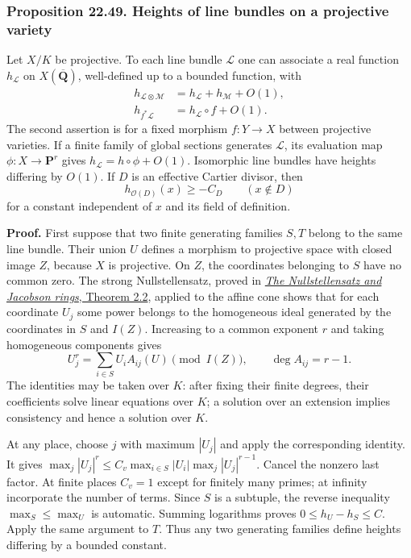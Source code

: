 \documentclass[
  11pt,
  a4paper,
]{article}
\begin{document}
\subsubsection{Proposition 22.49. Heights of line bundles on a
projective
variety}\label{proposition-22.49.-heights-of-line-bundles-on-a-projective-variety}

Let \(X/K\) be projective. To each line bundle \(\mathcal L\) one can
associate a real function \(h_{\mathcal L}\) on
\(X(\overline{\mathbf Q})\), well-defined up to a bounded function, with
\[
\begin{split}
 h_{\mathcal L\otimes\mathcal M}&=h_{\mathcal L}+h_{\mathcal M}+O(1),\\
 h_{f^*\mathcal L}&=h_{\mathcal L}\circ f+O(1).
\end{split}
\tag{22.115}
\] The second assertion is for a fixed morphism \(f:Y\to X\) between
projective varieties. If a finite family of global sections generates
\(\mathcal L\), its evaluation map \(\phi:X\to\mathbf P^r\) gives
\(h_{\mathcal L}=h\circ\phi+O(1)\). Isomorphic line bundles have heights
differing by \(O(1)\). If \(D\) is an effective Cartier divisor, then \[
 h_{\mathcal O(D)}(x)\ge-C_D\qquad(x\notin D)
 \tag{22.116}
\] for a constant independent of \(x\) and its field of definition.

\textbf{Proof.} First suppose that two finite generating families
\(S,T\) belong to the same line bundle. Their union \(U\) defines a
morphism to projective space with closed image \(Z\), because \(X\) is
projective. On \(Z\), the coordinates belonging to \(S\) have no common
zero. The strong Nullstellensatz, proved in
\href{https://kokunoyumeto.github.io/open-math-courses-public/courses/AG-CA/the-nullstellensatz-and-jacobson-rings.html\#2-closed-points-detect-radical-equations}{\emph{The
Nullstellensatz and Jacobson rings}, Theorem 2.2}, applied to the affine
cone shows that for each coordinate \(U_j\) some power belongs to the
homogeneous ideal generated by the coordinates in \(S\) and \(I(Z)\).
Increasing to a common exponent \(r\) and taking homogeneous components
gives \[
 U_j^r=\sum_{i\in S}U_i A_{ij}(U)\pmod{I(Z)},
 \qquad \deg A_{ij}=r-1.
 \tag{22.117}
\] The identities may be taken over \(K\): after fixing their finite
degrees, their coefficients solve linear equations over \(K\); a
solution over an extension implies consistency and hence a solution over
\(K\).

At any place, choose \(j\) with maximum \(|U_j|\) and apply the
corresponding identity. It gives
\(\max_j|U_j|^r\le C_v\max_{i\in S}|U_i|\max_j|U_j|^{r-1}\). Cancel the
nonzero last factor. At finite places \(C_v=1\) except for finitely many
primes; at infinity incorporate the number of terms. Since \(S\) is a
subtuple, the reverse inequality \(\max_S\le\max_U\) is automatic.
Summing logarithms proves \(0\le h_U-h_S\le C\). Apply the same argument
to \(T\). Thus any two generating families define heights differing by a
bounded constant.
\end{document}
